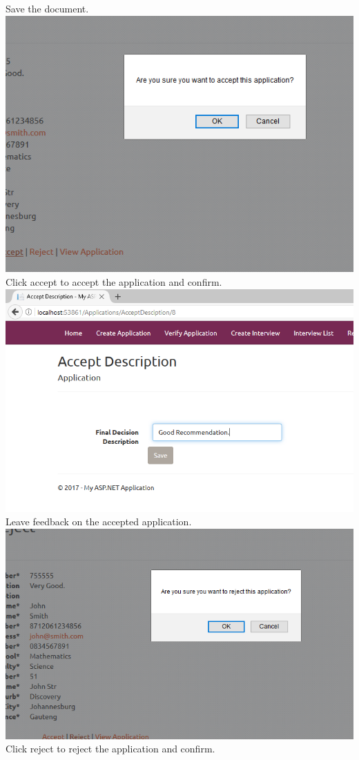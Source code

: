 \documentclass{article}
\begin{document}
\begin{center}
Save the document. \\ \bigskip
\includegraphics[scale=0.5]{AcceptApplication4.png}\\
Click accept to accept the application and confirm. \\ \bigskip
\includegraphics[scale=0.5]{AcceptApplication5.png}\\
Leave feedback on the accepted application.\\ \bigskip
\includegraphics[scale=0.5]{AcceptApplicationReject.png}\\
Click reject to reject the application and confirm.\\ \bigskip
\end{center}
\end{document}
